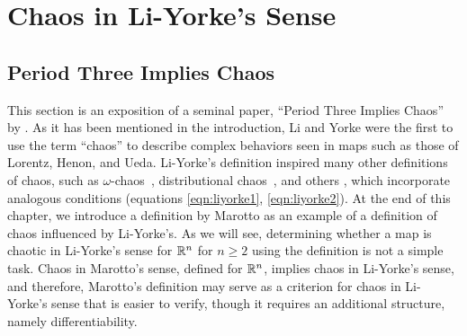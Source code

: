 \documentclass[10pt,draft,twoside]{book}
\begin{document}
\chapter{Chaos in Li-Yorke's Sense}
\label{chap:liyorke}

\section{Period Three Implies Chaos}
This section is an exposition of a seminal paper, ``Period Three Implies Chaos'' by \citet{li-yorke}.
As it has been mentioned in the introduction, Li and Yorke were the first to use the term ``chaos'' to describe complex behaviors seen in maps such as those of Lorentz, Henon, and Ueda.
Li-Yorke's definition inspired many other definitions of chaos, such as $\omega$-chaos~\citep{omegachaos}, distributional chaos~\citep{dchaos1}, and others \citep{genericchaos,densechaos,extremechaos}, which incorporate analogous conditions (equations \ref{eqn:liyorke1}, \ref{eqn:liyorke2}).
At the end of this chapter, we introduce a definition by Marotto as an example of a definition of chaos influenced by Li-Yorke's.
As we will see, determining whether a map is chaotic in Li-Yorke's sense for $\mathbb{R}^n$ for $n \geq 2$ using the definition is not a simple task.
Chaos in Marotto's sense, defined for $\mathbb{R}^n$, implies chaos in Li-Yorke's sense, and therefore, Marotto's definition may serve as a criterion for chaos in Li-Yorke's sense that is easier to verify, though it requires an additional structure, namely differentiability.

\end{document}
